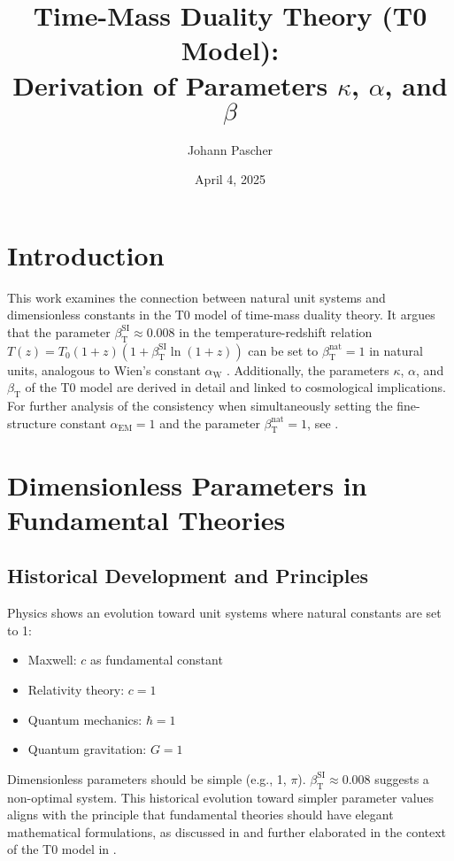 \documentclass[12pt,a4paper]{article}
\newcommand{\alphaEM}{\alpha_{\text{EM}}}
\newcommand{\betaT}{\beta_{\text{T}}}
\newcommand{\alphaW}{\alpha_{\text{W}}}
\begin{document}
	
	\title{Time-Mass Duality Theory (T0 Model): \\ Derivation of Parameters \(\kappa\), \(\alpha\), and \(\beta\)}
	\author{Johann Pascher}
	\date{April 4, 2025}
	
	\maketitle
	
	\section*{Introduction}
	\label{sec:introduction}
	
	This work examines the connection between natural unit systems and dimensionless constants in the T0 model of time-mass duality theory. It argues that the parameter \(\betaT^{\text{SI}} \approx 0.008\) in the temperature-redshift relation \(T(z) = T_0 (1+z)(1+\betaT^{\text{SI}}\ln(1+z))\) can be set to \(\betaT^{\text{nat}} = 1\) in natural units, analogous to Wien's constant \(\alphaW\) \cite{pascher_temp_2025}. Additionally, the parameters \(\kappa\), \(\alpha\), and \(\betaT\) of the T0 model are derived in detail and linked to cosmological implications. For further analysis of the consistency when simultaneously setting the fine-structure constant \(\alphaEM = 1\) and the parameter \(\betaT^{\text{nat}} = 1\), see \cite{pascher_alphabeta_2025}.
	
	\tableofcontents
	\newpage
	
	\section{Dimensionless Parameters in Fundamental Theories}
	\label{sec:dimensionless_params}
	
	\subsection{Historical Development and Principles}
	\label{subsec:historical_development}
	
	Physics shows an evolution toward unit systems where natural constants are set to 1:
	\begin{itemize}
		\item Maxwell: \(c\) as fundamental constant
		\item Relativity theory: \(c = 1\)
		\item Quantum mechanics: \(\hbar = 1\)
		\item Quantum gravitation: \(G = 1\)
	\end{itemize}
	Dimensionless parameters should be simple (e.g., 1, \(\pi\)). \(\betaT^{\text{SI}} \approx 0.008\) suggests a non-optimal system. This historical evolution toward simpler parameter values aligns with the principle that fundamental theories should have elegant mathematical formulations, as discussed in \cite{Duff2002} and further elaborated in the context of the T0 model in \cite{pascher_alpha_2025}.
	
\end{document}
